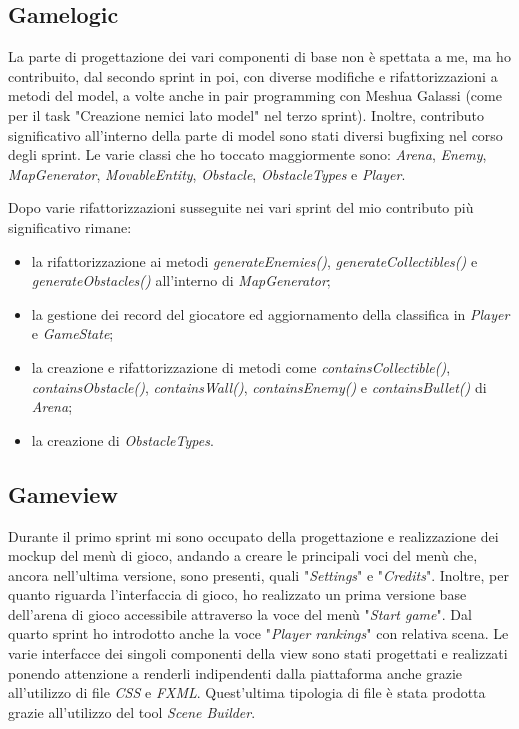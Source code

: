 \subsection{Gamelogic}
La parte di progettazione dei vari componenti di base non è spettata a me, ma ho contribuito, dal secondo sprint in poi, con diverse modifiche e rifattorizzazioni a metodi del model, a volte anche in pair programming con Meshua Galassi (come per il task "Creazione nemici lato model" nel terzo sprint).
Inoltre, contributo significativo all'interno della parte di model sono stati diversi bugfixing nel corso degli sprint.
Le varie classi che ho toccato maggiormente sono: \textit{Arena}, \textit{Enemy}, \textit{MapGenerator}, \textit{MovableEntity}, \textit{Obstacle}, \textit{ObstacleTypes} e \textit{Player}.

Dopo varie rifattorizzazioni susseguite nei vari sprint del mio contributo più significativo rimane:
\begin{itemize}
	\item la rifattorizzazione ai metodi \textit{generateEnemies()}, \textit{generateCollectibles()} e \textit{generateObstacles()} all'interno di \textit{MapGenerator};
	\item la gestione dei record del giocatore ed aggiornamento della classifica in \textit{Player} e \textit{GameState};
	\item la creazione e rifattorizzazione di metodi come \textit{containsCollectible()}, \textit{containsObstacle()}, \textit{containsWall()}, \textit{containsEnemy()} e \textit{containsBullet()} di \textit{Arena};
	\item la creazione di \textit{ObstacleTypes}.
\end{itemize}


\subsection{Gameview}
Durante il primo sprint mi sono occupato della progettazione e realizzazione dei mockup del menù di gioco, andando a creare le principali voci del menù che, ancora nell'ultima versione, sono presenti, quali "\textit{Settings}" e "\textit{Credits}".
Inoltre, per quanto riguarda l'interfaccia di gioco, ho realizzato un prima versione base dell'arena di gioco accessibile attraverso la voce del menù "\textit{Start game}".
Dal quarto sprint ho introdotto anche la voce "\textit{Player rankings}" con relativa scena.
Le varie interfacce dei singoli componenti della view sono stati progettati e realizzati ponendo attenzione a renderli indipendenti dalla piattaforma anche grazie all'utilizzo di file \textit{CSS} e \textit{FXML}.
Quest'ultima tipologia di file è stata prodotta grazie all'utilizzo del tool \textit{Scene Builder}.

